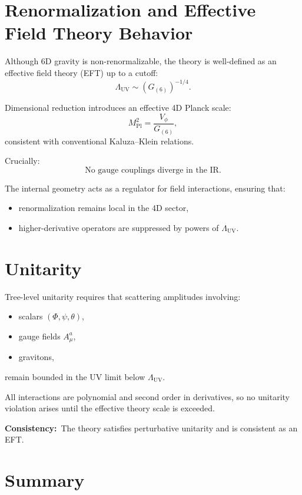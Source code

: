 \documentclass[12pt]{article}
\begin{document}

\newpage
\section{Renormalization and Effective Field Theory Behavior}

Although 6D gravity is non-renormalizable, the theory is well-defined as an
effective field theory (EFT) up to a cutoff:
\[
\Lambda_{\text{UV}} \sim (G_{(6)})^{-1/4}.
\]

Dimensional reduction introduces an effective 4D Planck scale:
\[
M_{\mathrm{Pl}}^2
=
\frac{V_\phi}{G_{(6)}},
\]
consistent with conventional Kaluza–Klein relations.

Crucially:
\[
\text{No gauge couplings diverge in the IR}.
\]

The internal geometry acts as a regulator for field interactions, ensuring
that:
\begin{itemize}
\item renormalization remains local in the 4D sector,
\item higher-derivative operators are suppressed by powers of \(\Lambda_{\text{UV}}\).
\end{itemize}


\newpage
\section{Unitarity}

Tree-level unitarity requires that scattering amplitudes involving:
\begin{itemize}
\item scalars \((\Phi, \psi, \theta)\),
\item gauge fields \(A_\mu^a\),
\item gravitons,
\end{itemize}
remain bounded in the UV limit below \(\Lambda_{\text{UV}}\).

All interactions are polynomial and second order in derivatives, so no
unitarity violation arises until the effective theory scale is exceeded.

\noindent\textbf{Consistency:}\
The theory satisfies perturbative unitarity and is consistent as an EFT.


\newpage
\section{Summary}
\end{document}
